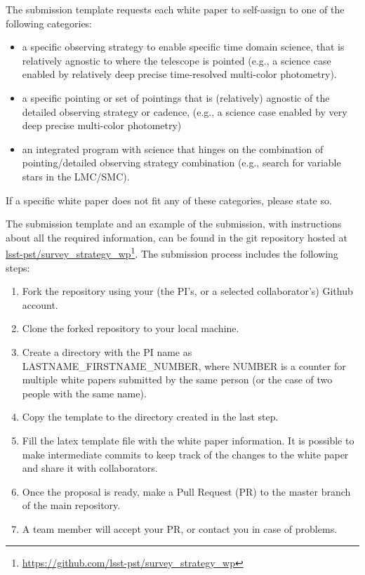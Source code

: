 \documentclass[DM,lsstdraft,toc,usenatbib]{lsstdoc}
\begin{document}
The submission template requests each white paper to self-assign to one of the following categories:
\begin{itemize} 
\item a specific observing strategy to enable specific time domain science, 
	that is relatively agnostic to where the telescope is pointed (e.g., a science case enabled 
	by relatively deep precise time-resolved multi-color photometry). 
\item a specific pointing or set of pointings that is (relatively) agnostic of the detailed observing 
	strategy or cadence, (e.g., a science case enabled by very deep precise multi-color 
	photometry)
\item an integrated program with science that hinges on the combination of pointing/detailed 
	observing strategy combination (e.g., search for variable stars in the 
	LMC/SMC). 
\end{itemize}  
If a specific white paper does not fit any of these categories, please state so.

The submission template and an example of the submission, with instructions about
all the required information, can be found in the git repository hosted at \href{https://github.com/lsst-pst/survey_strategy_wp}{lsst-pst/survey\_strategy\_wp}\footnote{\url{https://github.com/lsst-pst/survey_strategy_wp}}.
The submission process includes the following steps: 
%
\begin{enumerate}
\item Fork the repository using your (the PI's, or a selected collaborator's)  Github account.
\item Clone the forked repository to your local machine.
\item Create a directory with the PI name as LASTNAME\_FIRSTNAME\_NUMBER,
where NUMBER is a counter for multiple white papers submitted by the same person (or the case
of two people with the same name). 
\item Copy the template to the directory created in the last step.
\item Fill the latex template file with the white paper information. It is possible to make intermediate 
          commits to keep track of the changes to the white paper and share it with collaborators.
\item Once the proposal is ready, make a Pull Request (PR) to the master branch of the main repository. 
\item A team member will accept your PR, or contact you in case of problems. 
\end{enumerate}
\end{document}
